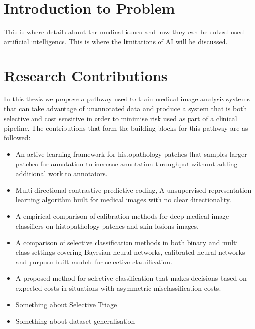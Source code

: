 \section{Introduction to Problem}
\label{sec:intoduction_to_problem}
This is where details about the medical issues and how they can be solved used artificial intelligence. This is where the limitations of AI will be discussed.


\section{Research Contributions}
\label{sec:research_contributions}

In this thesis we propose a pathway used to train medical image analysis systems that can take advantage of unannotated data and produce a system that is both selective and cost sensitive in order to minimise risk used as part of a clinical pipeline. The contributions that form the building blocks for this pathway are as followed:

\begin{itemize}
	\item An active learning framework for histopathology patches that samples larger patches for annotation to increase annotation throughput without adding additional work to annotators.
	
	\item Multi-directional contrastive predictive coding, A unsupervised representation learning algorithm built for medical images with no clear directionality.

	\item A empirical comparison of calibration methods for deep medical image classifiers on histopathology patches and skin lesions images.
	
	\item A comparison of selective classification methods in both binary and multi class settings covering Bayesian neural networks, calibrated neural networks and purpose built models for selective classification.
	
	\item A proposed method for selective classification that makes decisions based on expected costs in situations with asymmetric misclassification costs.
	
	\item Something about Selective Triage
	
	\item Something about dataset generalisation
\end{itemize}


